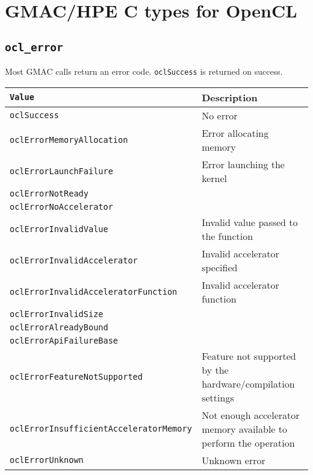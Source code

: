 \section{GMAC\slash HPE C types for OpenCL}

\subsection{\texttt{ocl\_error}}
Most GMAC calls return an error code. \texttt{oclSuccess} is returned on success.
\vspace{11pt}\\
\begin{tabularx}{\linewidth}{|>{\texttt\bgroup}l<{\egroup}|X|}
  \hline
  \textnormal{Value} & Description \\
  \hline
  \hline
  oclSuccess                            & No error                             \\
  oclErrorMemoryAllocation              & Error allocating memory              \\
  oclErrorLaunchFailure                 & Error launching the kernel           \\
  oclErrorNotReady                      &                                      \\
  oclErrorNoAccelerator                 &                                      \\
  oclErrorInvalidValue                  & Invalid value passed to the function \\
  oclErrorInvalidAccelerator            & Invalid accelerator specified        \\
  oclErrorInvalidAcceleratorFunction    & Invalid accelerator function         \\
  oclErrorInvalidSize                   &                                      \\
  oclErrorAlreadyBound                  &                                      \\
  oclErrorApiFailureBase                &                                      \\
  oclErrorFeatureNotSupported           & Feature not supported by the hardware\slash{}compilation
                                          settings                             \\
  oclErrorInsufficientAcceleratorMemory & Not enough accelerator memory available to perform the 
                                          operation                            \\
  oclErrorUnknown                       & Unknown error                        \\
  \hline
\end{tabularx}

